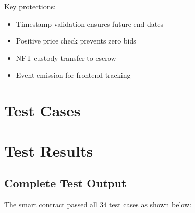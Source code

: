 \documentclass{article}
\begin{document}
Key protections:
\begin{itemize}
    \item Timestamp validation ensures future end dates
    \item Positive price check prevents zero bids
    \item NFT custody transfer to escrow
    \item Event emission for frontend tracking
\end{itemize}

\section{Test Cases}

\section{Test Results}

\subsection{Complete Test Output}
The smart contract passed all 34 test cases as shown below:
\end{document}

